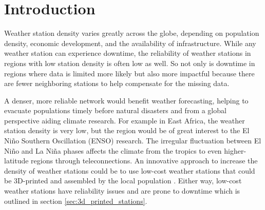 \section{Introduction}
\label{sec:introduction}


Weather station density varies greatly across the globe, depending on population density, economic development, and the availability of infrastructure. \cite{ortizbobea2021} While any weather station can experience downtime, the reliability of weather stations in regions with low station density is often low as well. So not only is downtime in regions where data is limited more likely but also more impactful because there are fewer neighboring stations to help compensate for the missing data.


A denser, more reliable network would benefit weather forecasting, helping to evacuate populations timely before natural disasters and from a global perspective aiding climate research. For example in East Africa, the weather station density is very low, but the region would be of great interest to the El Niño Southern Oscillation (ENSO) research. The irregular fluctuation between El Niño and La Niña phases affects the climate from the tropics to even higher-latitude regions through teleconnections. \cite{marchant2007, muita2021}  An innovative approach to increase the density of weather stations could be to use low-cost weather stations that could be 3D-printed and assembled by the local population \cite{muita2021}. Either way, low-cost weather stations have reliability issues and are prone to downtime which is outlined in section \ref{sec:3d_printed_stations}.


